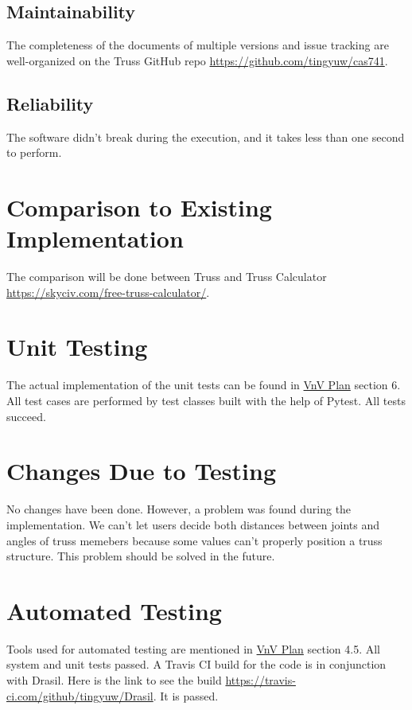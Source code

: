 \documentclass[12pt, titlepage]{article}
\begin{document}
\subsection{Maintainability} \label{main}
The completeness of the documents of multiple versions and issue tracking are 
well-organized on the Truss GitHub repo  
\url{https://github.com/tingyuw/cas741}.

\subsection{Reliability} \label{relia}
The software didn't break during the execution, and it takes less than one 
second to perform.

\section{Comparison to Existing Implementation}	
The comparison will be done between Truss and Truss Calculator
\url{https://skyciv.com/free-truss-calculator/}.

\section{Unit Testing}
The actual implementation of the unit tests can be found in
\href{https://github.com/tingyuw/cas741/blob/master/docs/VnVPlan/VnVPlan.pdf}{VnV
 Plan} section 6. All test cases are performed by test classes built with the 
 help of Pytest. All tests succeed.

\section{Changes Due to Testing}
No changes have been done. However, a problem was found during the 
implementation. We can't let users decide both distances between joints and 
angles of truss memebers because some values can't properly position a truss 
structure. This problem should be solved in the future.

\section{Automated Testing}
Tools used for automated testing are mentioned in 
\href{https://github.com/tingyuw/cas741/blob/master/docs/VnVPlan/VnVPlan.pdf}{VnV
 Plan} section 4.5. All system and unit tests passed. A Travis CI build for the 
code is in conjunction with Drasil. Here is the link to see the build 
\url{https://travis-ci.com/github/tingyuw/Drasil}. It is passed.
\end{document}
